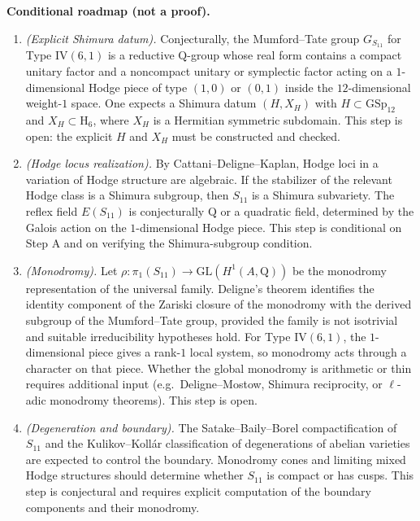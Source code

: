 \documentclass{article}
\newcommand{\mathbb}[1]{\mathrm{#1}}
\begin{document}
\medskip
\noindent\textbf{Conditional roadmap (not a proof).}

\begin{enumerate}
\item[\textbf{Step A}] \emph{(Explicit Shimura datum).} Conjecturally, the Mumford--Tate group $G_{S_{11}}$ for Type IV$(6,1)$ is a reductive $\mathbb{Q}$-group whose real form contains a compact unitary factor and a noncompact unitary or symplectic factor acting on a $1$-dimensional Hodge piece of type $(1,0)$ or $(0,1)$ inside the $12$-dimensional weight-$1$ space. One expects a Shimura datum $(H, X_H)$ with $H \subset \mathrm{GSp}_{12}$ and $X_H \subset \mathbb{H}_6$, where $X_H$ is a Hermitian symmetric subdomain. This step is open: the explicit $H$ and $X_H$ must be constructed and checked.

\item[\textbf{Step B}] \emph{(Hodge locus realization).} By Cattani--Deligne--Kaplan, Hodge loci in a variation of Hodge structure are algebraic. If the stabilizer of the relevant Hodge class is a Shimura subgroup, then $S_{11}$ is a Shimura subvariety. The reflex field $E(S_{11})$ is conjecturally $\mathbb{Q}$ or a quadratic field, determined by the Galois action on the $1$-dimensional Hodge piece. This step is conditional on Step A and on verifying the Shimura-subgroup condition.

\item[\textbf{Step C}] \emph{(Monodromy).} Let $\rho \colon \pi_1(S_{11}) \to \mathrm{GL}(H^1(A,\mathbb{Q}))$ be the monodromy representation of the universal family. Deligne's theorem identifies the identity component of the Zariski closure of the monodromy with the derived subgroup of the Mumford--Tate group, provided the family is not isotrivial and suitable irreducibility hypotheses hold. For Type IV$(6,1)$, the $1$-dimensional piece gives a rank-$1$ local system, so monodromy acts through a character on that piece. Whether the global monodromy is arithmetic or thin requires additional input (e.g.\ Deligne--Mostow, Shimura reciprocity, or $\ell$-adic monodromy theorems). This step is open.

\item[\textbf{Step D}] \emph{(Degeneration and boundary).} The Satake--Baily--Borel compactification of $S_{11}$ and the Kulikov--Koll\'ar classification of degenerations of abelian varieties are expected to control the boundary. Monodromy cones and limiting mixed Hodge structures should determine whether $S_{11}$ is compact or has cusps. This step is conjectural and requires explicit computation of the boundary components and their monodromy.


\end{enumerate}
\end{document}
